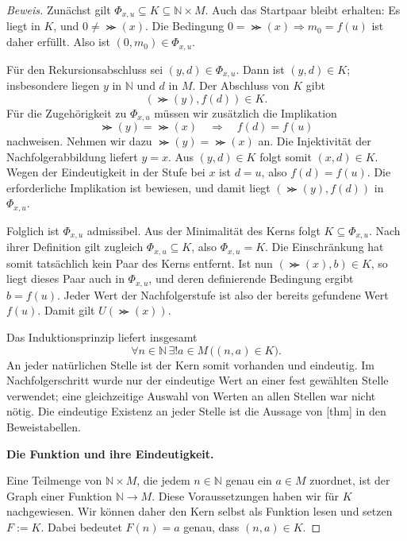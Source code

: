 \begin{proof}[Beweis]
Zunächst gilt
\(\Phi_{x,u}\subseteq K\subseteq\mathbb N\times M\).
Auch das Startpaar bleibt erhalten: Es liegt in \(K\), und
\(0\neq\Succ(x)\). Die Bedingung
\(0=\Succ(x)\Longrightarrow m_0=f(u)\) ist daher erfüllt.
Also ist \((0,m_0)\in\Phi_{x,u}\).

Für den Rekursionsabschluss sei \((y,d)\in\Phi_{x,u}\).
Dann ist \((y,d)\in K\); insbesondere liegen \(y\) in
\(\mathbb N\) und \(d\) in \(M\). Der Abschluss von
\(K\) gibt
\[
  (\Succ(y),f(d))\in K.
\]
Für die Zugehörigkeit zu \(\Phi_{x,u}\) müssen wir zusätzlich
die Implikation
\[
  \Succ(y)=\Succ(x)\quad\Longrightarrow\quad f(d)=f(u)
\]
nachweisen. Nehmen wir dazu \(\Succ(y)=\Succ(x)\) an.
Die Injektivität der Nachfolgerabbildung liefert \(y=x\).
Aus \((y,d)\in K\) folgt somit \((x,d)\in K\).
Wegen der Eindeutigkeit in der Stufe bei \(x\) ist \(d=u\),
also \(f(d)=f(u)\). Die erforderliche Implikation ist bewiesen,
und damit liegt \((\Succ(y),f(d))\) in \(\Phi_{x,u}\).

Folglich ist \(\Phi_{x,u}\) admissibel. Aus der Minimalität
des Kerns folgt \(K\subseteq\Phi_{x,u}\). Nach ihrer Definition
gilt zugleich \(\Phi_{x,u}\subseteq K\), also
\(\Phi_{x,u}=K\). Die Einschränkung hat somit tatsächlich kein
Paar des Kerns entfernt.
Ist nun \((\Succ(x),b)\in K\), so liegt dieses Paar auch
in \(\Phi_{x,u}\), und deren definierende Bedingung ergibt
\(b=f(u)\). Jeder Wert der Nachfolgerstufe ist also der bereits
gefundene Wert \(f(u)\). Damit gilt \(U(\Succ(x))\).

\DedekindFixingDiagram

Das Induktionsprinzip liefert insgesamt
\[
  \forall n\in\mathbb N\,
    \exists!a\in M\,\bigl((n,a)\in K\bigr).
\]
An jeder natürlichen Stelle ist der Kern somit vorhanden und
eindeutig. Im Nachfolgerschritt wurde nur der eindeutige Wert an
einer fest gewählten Stelle verwendet; eine gleichzeitige Auswahl
von Werten an allen Stellen war nicht nötig.
Die eindeutige Existenz an jeder Stelle ist die Aussage von
[thm] in den Beweistabellen.

\par{}
\medskip\noindent\textbf{Die Funktion und ihre Eindeutigkeit.}

Eine Teilmenge von \(\mathbb N\times M\), die jedem
\(n\in\mathbb N\) genau ein \(a\in M\) zuordnet, ist
der Graph einer Funktion \(\mathbb N\to M\).
Diese Voraussetzungen haben wir für \(K\) nachgewiesen.
Wir können daher den Kern selbst als Funktion lesen und setzen
\(F:=K\). Dabei bedeutet \(F(n)=a\) genau, dass
\((n,a)\in K\).


\end{proof}
